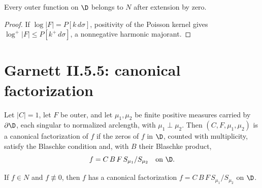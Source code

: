 \begin{theorem}
  \label{thm:outer_mem_nevanlinna}
  \leanok
  Every outer function on $\D$ belongs to $N$ after extension by zero.
  \begin{proof}
    \leanok
    If $\log|F|=P[k\,d\sigma]$, positivity of the Poisson kernel gives
    $\log^+|F|\le P[k^+\,d\sigma]$, a nonnegative harmonic majorant.
  \end{proof}
\end{theorem}

\section{Garnett II.5.5: canonical factorization}

\begin{definition}
  \label{def:canonical_factorization}
  \leanok
  Let $|C|=1$, let $F$ be outer, and let $\mu_1,\mu_2$ be finite positive
  measures carried by $\partial\D$, each singular to normalized arclength,
  with $\mu_1\perp\mu_2$. Then $(C,F,\mu_1,\mu_2)$ is a canonical
  factorization of $f$ if the zeros of $f$ in $\D$, counted with multiplicity,
  satisfy the Blaschke condition and, with $B$ their Blaschke product,
  \[
    f = C\,B\,F\,S_{\mu_1}/S_{\mu_2}\quad\text{on }\D.
  \]
\end{definition}

\begin{theorem}
  \label{thm:nevanlinna_canonical_factorization}
  \leanok
  \mainline
  If $f\in N$ and $f\not\equiv0$, then $f$ has a canonical factorization
  $f=C\,B\,F\,S_{\mu_1}/S_{\mu_2}$ on $\D$.
\end{theorem}

